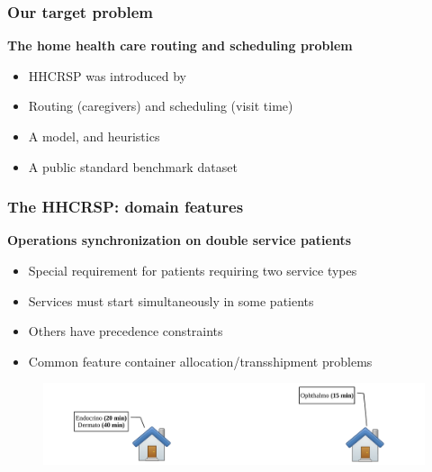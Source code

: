 \begin{frame}
   \frametitle{Our target problem}

   \textbf{The home health care routing and scheduling problem}
   \begin{itemize}
      \item HHCRSP was introduced by \citet{mankowska2014}
      \item Routing (caregivers) and scheduling (visit time)
      \item A model, and heuristics
      \item A public standard benchmark dataset
   \end{itemize}



\end{frame}





\begin{frame}
   \frametitle{The HHCRSP: domain features}
   \textbf{Operations synchronization on double service patients}
   \begin{itemize}
      \item Special requirement for patients requiring two service types
      \item Services must start simultaneously in some patients
      \item Others have precedence constraints
      \item Common feature container allocation/transshipment problems \citep{drexl2012synchronization}
   \end{itemize}


   \begin{figure}[H]
      \includegraphics[width=1\textwidth,page=2]{fig/skilled}
   \end{figure}

\end{frame}

